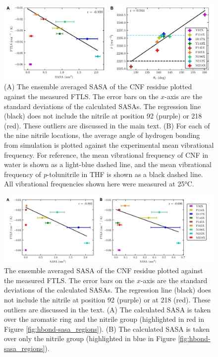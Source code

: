 \begin{figure}
    \center
    \includegraphics[width=\double]{figures-gfp-hbond/Figure8_combined.pdf}
    \caption[Comparison of calculated properties (SASA and hydrogen bonding angle) against experimental counterparts (FTLS and nitrile frequency)]{
        (A) The ensemble averaged SASA of the CNF residue plotted against the measured FTLS. 
        The error bars on the $x$-axis are the standard deviations of the calculated SASAs. 
        The regression line (black) does not include the nitrile at position 92 (purple) or 218 (red). 
        These outliers are discussed in the main text. 
        (B) For each of the nine nitrile locations, the average angle of hydrogen bonding from simulation is plotted against the experimental mean vibrational frequency. 
        For reference, the mean vibrational frequency of CNF in water is shown as a light-blue dashed line, and the mean vibrational frequency of \emph{p}-tolunitrile in THF is shown as a black dashed line. 
        All vibrational frequencies shown here were measured at 25\si{\celsius}.
    }
    \label{fig:hbond-comparison}
\end{figure}

\begin{figure}
    \center
    \includegraphics[width=\double]{figures-gfp-hbond/FigureS3_combined.png}
    \caption[Calculated SASA of smaller subsets of atoms against the measured FTLS]{
        The ensemble averaged SASA of the CNF residue plotted against the measured FTLS. 
        The error bars on the $x$-axis are the standard deviations of the calculated SASAs. 
        The regression line (black) does not include the nitrile at position 92 (purple) or at 218 (red). 
        These outliers are discussed in the text. 
        (A) The calculated SASA is taken over the aromatic ring and the nitrile group (highlighted in red in Figure \ref{fig:hbond-sasa_regions}). 
        (B) The calculated SASA is taken over only the nitrile group (highlighted in blue in Figure \ref{fig:hbond-sasa_regions}).
    }
    \label{fig:hbond-regions_v_FTLS}
\end{figure}


